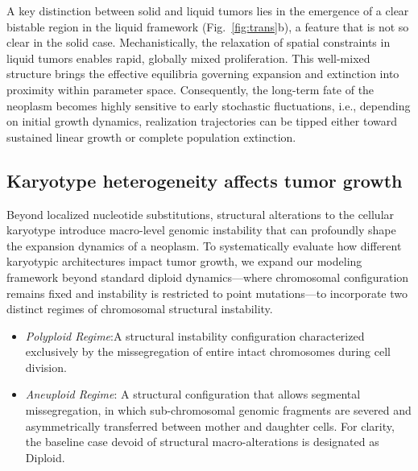 \documentclass[10pt, aps, rmp,  twocolumn, superscriptaddress, floatfix, showkeys]{revtex4-2}
\begin{document}
A key distinction between solid and liquid tumors lies in the emergence of a clear bistable region in the liquid framework (Fig.~\ref{fig:trans}b), a feature that is not so clear in the solid case. Mechanistically, the relaxation of spatial constraints in liquid tumors enables rapid, globally mixed proliferation. This well-mixed structure brings the effective equilibria governing expansion and extinction into proximity within parameter space. Consequently, the long-term fate of the neoplasm becomes highly sensitive to early stochastic fluctuations, i.e., depending on initial growth dynamics, realization trajectories can be tipped either toward sustained linear growth or complete population extinction.


\subsection*{Karyotype heterogeneity affects tumor growth}

Beyond localized nucleotide substitutions, structural alterations to the cellular karyotype introduce macro-level genomic instability that can profoundly shape the expansion dynamics of a neoplasm. To systematically evaluate how different karyotypic architectures impact tumor growth, we expand our modeling framework beyond standard diploid dynamics—where chromosomal configuration remains fixed and instability is restricted to point mutations—to incorporate two distinct regimes of chromosomal structural instability. %
\begin{itemize}
    \item \textit{Polyploid Regime}:A structural instability configuration characterized exclusively by the missegregation of entire intact chromosomes during cell division.  
    \item \textit{Aneuploid Regime}: A structural configuration that allows segmental missegregation, in which sub-chromosomal genomic fragments are severed and asymmetrically transferred between mother and daughter cells. For clarity, the baseline case devoid of structural macro-alterations is designated as Diploid.
\end{itemize}
\end{document}
